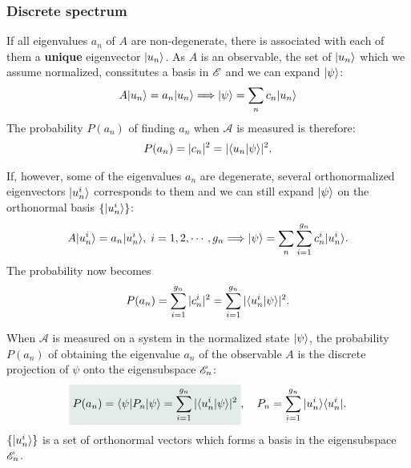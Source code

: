 \subsubsection{Discrete spectrum}
If all eigenvalues $a_n$ of $A$ are non-degenerate, there is associated with each of them a \textbf{unique} eigenvector $|u_n\rangle$.
As $A$ is an observable, the set of $|u_n\rangle$ which we assume normalized, conssitutes a basis in $\mathscr{E}$ and we can expand $|\psi\rangle$:
\begin{align*}
    A|u_n\rangle=a_n|u_n\rangle\Longrightarrow |\psi\rangle=\sum_nc_n|u_n\rangle
\end{align*}
The probability $P(a_n)$ of finding $a_n$ when $\mathcal{A}$ is measured is therefore:
\begin{align*}
    P(a_n)=|c_n|^2=|\langle u_n|\psi\rangle|^2.
\end{align*}

If, however, some of the eigenvalues $a_n$ are degenerate, several orthonormalized eigenvectors $|u_n^i\rangle$ corresponds to them and we can still 
expand $|\psi\rangle$ on the orthonormal basis $\{|u_n^i\rangle\}$:
\begin{align}
    A|u_n^i\rangle=a_n|u_n^i\rangle,\;i=1,2,\cdots,g_n\Longrightarrow |\psi\rangle=\sum_n\sum_{i=1}^{g_n}c_n^i|u_n^i\rangle.
    \label{eq:discretedegenerateexpansion}
\end{align}
The probability now becomes
\begin{align}
    P(a_n)=\sum_{i=1}^{g_n}|c_n^i|^2=\sum_{i=1}^{g_n}|\langle u_n^i|\psi\rangle|^2.
\end{align}

\begin{definition}
    When $\mathcal{A}$ is measured on a system in the normalized state $|\psi\rangle$, the probability $P(a_n)$ of 
    obtaining the eigenvalue $a_n$ of the observable $A$ is the discrete projection of $\psi$ onto the eigensubspace $\mathscr{E}_n$:
    \begin{align*}
        \highlight{P(a_n)=\braket{\psi|P_n|\psi}=\sum_{i=1}^{g_n}|\braket{u^i_n|\psi}|^2},\quad P_n=\sum_{i=1}^{g_n}\ket{u_n^i}\bra{u_n^i}.
    \end{align*}
    $\{|u_n^i\rangle\}$ is a set of orthonormal vectors which forms a basis in the eigensubspace $\mathscr{E}_n$.
\end{definition}
